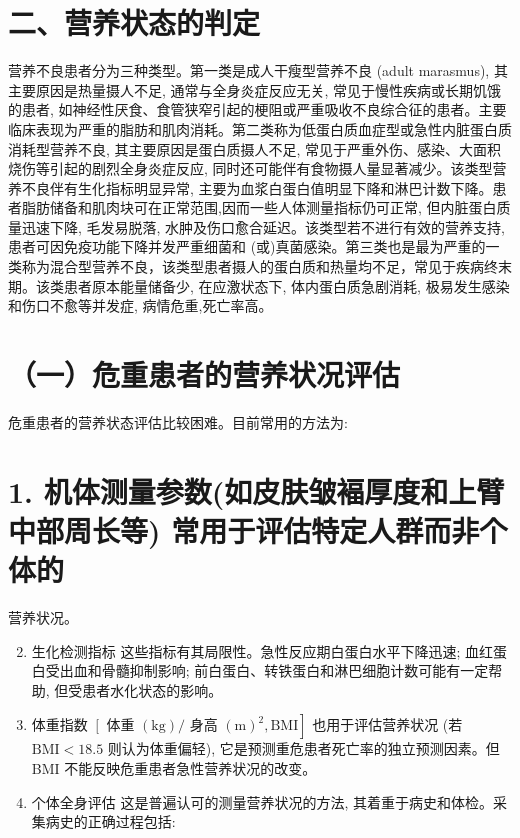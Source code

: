 \documentclass[10pt]{article}
\begin{document}
\section*{二、营养状态的判定}
营养不良患者分为三种类型。第一类是成人干瘦型营养不良 (adult marasmus), 其主要原因是热量摄人不足, 通常与全身炎症反应无关, 常见于慢性疾病或长期饥饿的患者, 如神经性厌食、食管狭窄引起的梗阻或严重吸收不良综合征的患者。主要临床表现为严重的脂肪和肌肉消耗。第二类称为低蛋白质血症型或急性内脏蛋白质消耗型营养不良, 其主要原因是蛋白质摄人不足, 常见于严重外伤、感染、大面积烧伤等引起的剧烈全身炎症反应, 同时还可能伴有食物摄人量显著减少。该类型营养不良伴有生化指标明显异常, 主要为血浆白蛋白值明显下降和淋巴计数下降。患者脂肪储备和肌肉块可在正常范围,因而一些人体测量指标仍可正常, 但内脏蛋白质量迅速下降, 毛发易脱落, 水肿及伤口愈合延迟。该类型若不进行有效的营养支持, 患者可因免疫功能下降并发严重细菌和 (或)真菌感染。第三类也是最为严重的一类称为混合型营养不良，该类型患者摄人的蛋白质和热量均不足，常见于疾病终末期。该类患者原本能量储备少, 在应激状态下, 体内蛋白质急剧消耗, 极易发生感染和伤口不愈等并发症, 病情危重,死亡率高。

\section*{（一）危重患者的营养状况评估}
危重患者的营养状态评估比较困难。目前常用的方法为:

\section*{1. 机体测量参数(如皮肤皱褔厚度和上臂中部周长等) 常用于评估特定人群而非个体的}
营养状况。\begin{enumerate}
  \setcounter{enumi}{1}
  \item 生化检测指标 这些指标有其局限性。急性反应期白蛋白水平下降迅速; 血红蛋白受出血和骨髓抑制影响; 前白蛋白、转铁蛋白和淋巴细胞计数可能有一定帮助, 但受患者水化状态的影响。

  \item 体重指数 $\left[\right.$ 体重 $(\mathrm{kg}) /$ 身高 $\left.(\mathrm{m})^{2}, \mathrm{BMI}\right]$ 也用于评估营养状况 (若 $\mathrm{BMI}<18.5$ 则认为体重偏轻), 它是预测重危患者死亡率的独立预测因素。但 BMI 不能反映危重患者急性营养状况的改变。

  \item 个体全身评估 这是普遍认可的测量营养状况的方法, 其着重于病史和体检。采集病史的正确过程包括:

\end{enumerate}
\end{document}
